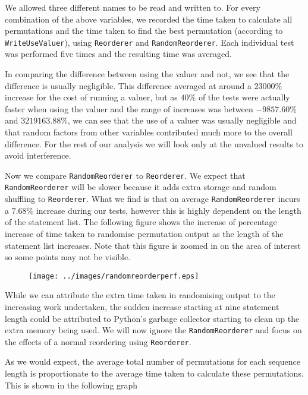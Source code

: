 \documentclass[twoside,a4paper]{report}
\begin{document}
We allowed three different names to be read and written to. For every combination of the above variables, we recorded the time taken to calculate all
permutations and the time taken to find the best permutation (according to \texttt{WriteUseValuer}), using \texttt{Reorderer} and \texttt{RandomReorderer}.
Each individual test was performed five times and the resulting time was averaged.

In comparing the difference between using the valuer and not, we see that the difference is usually negligible. This difference averaged at around a $23000\%$
increase for the cost of running a valuer, but as $40\%$ of the tests were actually faster when using the valuer and the range of increases was between
$-9857.60\%$ and $3219163.88\%$, we can see that the use of a valuer was usually negligible and that random factors from other variables contributed much more to
the overall difference. For the rest of our analysis we will look only at the unvalued results to avoid interference.

Now we compare \texttt{RandomReorderer} to \texttt{Reorderer}. We expect that \texttt{RandomReorderer} will be slower because it adds extra storage and random
shuffling to \texttt{Reorderer}. What we find is that on average \texttt{RandomReorderer} incurs a $7.68\%$ increase during our tests, however this is highly
dependent on the length of the statement list. The following figure shows the increase of percentage increase of time taken to randomise permutation output
as the length of the statement list increases. Note that this figure is zoomed in on the area of interest so some points may not be visible.

\begin{figure}[h]
\centering
\scalebox{0.75}
{\texttt{[image: ../images/randomreorderperf.eps]}}
\end{figure}

While we can attribute the extra time taken in randomising output to the increasing work undertaken, the sudden increase starting at nine
statement length could be attributed to Python's garbage collector starting to clean up the extra memory being used. We will now ignore the
\texttt{RandomReorderer} and focus on the effects of a normal reordering using \texttt{Reorderer}.

As we would expect, the average total number of permutations for each sequence length is proportionate to the average time taken to calculate these permutations.
This is shown in the following graph
\end{document}
